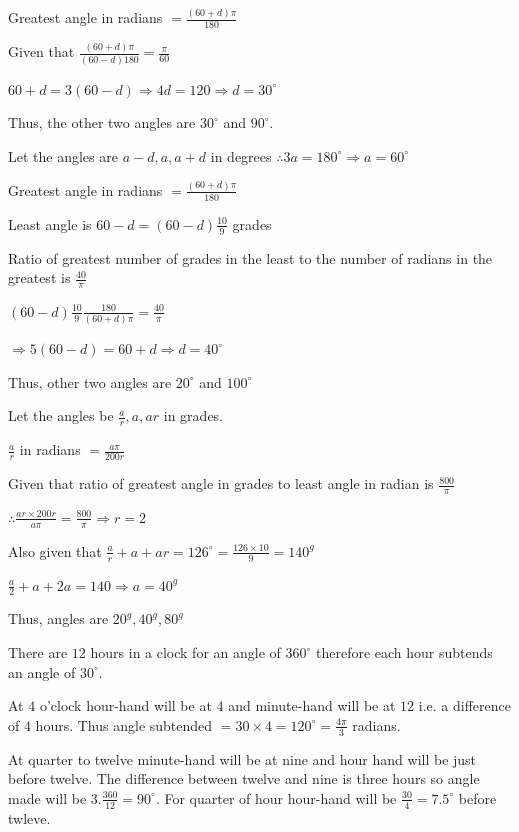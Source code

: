     Greatest angle in radians $= \frac{(60 + d)\pi}{180}$

    Given that $\frac{(60 + d)\pi}{(60 - d)180} = \frac{\pi}{60}$

    $60 + d = 3(60 - d) \Rightarrow 4d = 120 \Rightarrow d = 30^\circ$

    Thus, the other two angles are $30^\circ$ and $90^\circ.$
\item Let the angles are $a - d, a, a + d$ in degrees $\therefore 3a = 180^\circ \Rightarrow a = 60^\circ$

    Greatest angle in radians $= \frac{(60 + d)\pi}{180}$

    Least angle is $60 - d = (60 - d)\frac{10}{9}$ grades

    Ratio of greatest number of grades in the least to the number of radians in the greatest is $\frac{40}{\pi}$

    $(60 - d)\frac{10}{9}\frac{180}{(60 + d)\pi} = \frac{40}{\pi}$

    $\Rightarrow 5(60 - d) = 60 + d \Rightarrow d = 40^\circ$

    Thus, other two angles are $20^\circ$ and $100^\circ$
\item Let the angles be $\frac{a}{r}, a, ar$ in grades.

    $\frac{a}{r}$ in radians $=\frac{a\pi}{200r}$

    Given that ratio of greatest angle in grades to least angle in radian is $\frac{800}{\pi}$

    $\therefore \frac{ar\times 200r}{a\pi} = \frac{800}{\pi} \Rightarrow r = 2$

    Also given that $\frac{a}{r} + a + ar = 126^\circ = \frac{126\times 10}{9} = 140^g$

    $\frac{a}{2} + a + 2a = 140 \Rightarrow a = 40^g$

    Thus, angles are $20^g, 40^g, 80^g$
\item There are $12$ hours in a clock for an angle of $360^\circ$ therefore each hour subtends an angle of
    $30^\circ.$

    At $4$ o'clock hour-hand will be at $4$ and minute-hand will be at $12$ i.e. a difference of $4$
    hours. Thus angle subtended $= 30\times 4 = 120^\circ = \frac{4\pi}{3}$ radians.
\item At quarter to twelve minute-hand will be at nine and hour hand will be just before twelve. The difference between twelve and
    nine is three hours so angle made will be $3.\frac{360}{12} = 90^\circ.$ For quarter of hour hour-hand will be
    $\frac{30}{4} = 7.5^\circ$ before twleve.

